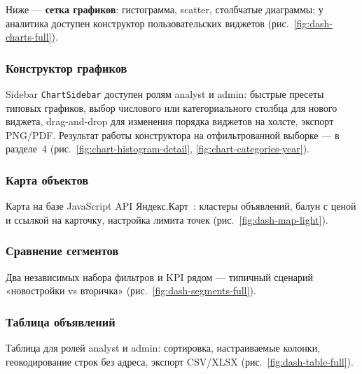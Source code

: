 Ниже --- \textbf{сетка графиков}: гистограмма, scatter, столбчатые диаграммы; у аналитика доступен конструктор пользовательских виджетов (рис.~\ref{fig:dash-charts-full}).


\subsubsection{Конструктор графиков}

Sidebar \texttt{ChartSidebar} доступен ролям analyst и admin: быстрые пресеты типовых графиков, выбор числового или категориального столбца для нового виджета, drag-and-drop для изменения порядка виджетов на холсте, экспорт PNG/PDF. Результат работы конструктора на отфильтрованной выборке --- в разделе~4 (рис.~\ref{fig:chart-histogram-detail}, \ref{fig:chart-categories-year}).

\subsubsection{Карта объектов}

Карта на базе JavaScript API Яндекс.Карт~\cite{yandex-maps-api}: кластеры объявлений, балун с ценой и ссылкой на карточку, настройка лимита точек (рис.~\ref{fig:dash-map-light}).


\subsubsection{Сравнение сегментов}

Два независимых набора фильтров и KPI рядом --- типичный сценарий «новостройки vs вторичка» (рис.~\ref{fig:dash-segments-full}).


\subsubsection{Таблица объявлений}

Таблица для ролей analyst и admin: сортировка, настраиваемые колонки, геокодирование строк без адреса, экспорт CSV/XLSX (рис.~\ref{fig:dash-table-full}).

